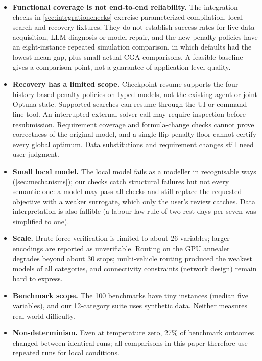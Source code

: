 \begin{itemize}
        condition. Hybrid service results are distinct from direct QPU sampling, and use a ten-second limit
        versus the three-second CGA ceiling; the resource allocations do not establish hardware superiority.
        Effects depend on the problem; Fujitsu DA rejected a submission due to its monthly
        account limit. The earlier simulation advantage is small, and neither role splitting nor retrieval
        helped there. Large-scale repeated hardware and held-out backend-transfer studies remain open.
  \item \textbf{Functional coverage is not end-to-end reliability.} The integration checks in
        \cref{sec:integrationchecks} exercise parameterized compilation, local search and recovery fixtures.
        They do not establish success rates for live data acquisition, LLM diagnosis or model repair, and the
        new penalty policies have an eight-instance repeated simulation comparison, in which defaults had the
        lowest mean gap, plus small actual-CGA comparisons. A feasible
        baseline gives a comparison point, not a guarantee of application-level quality.
  \item \textbf{Recovery has a limited scope.} Checkpoint resume supports the four history-based penalty
        policies on typed models, not the existing agent or joint Optuna state. Supported searches can resume
        through the UI or command-line tool. An interrupted external solver call may
        require inspection before resubmission. Requirement coverage and formula-change checks cannot prove
        correctness of the original model, and a single-flip penalty floor cannot certify every global
        optimum. Data substitutions and requirement changes still need user judgment.
  \item \textbf{Small local model.} The local model fails as a modeller in recognisable ways (\cref{sec:mechanisms});
        our checks catch structural failures but not every semantic one: a model may pass all checks and still
        replace the requested objective with a weaker surrogate, which only the user's review catches. Data
        interpretation is also fallible (a labour-law rule of two rest days per seven was simplified to one).
  \item \textbf{Scale.} Brute-force verification is limited to about 26 variables; larger encodings are reported
        as unverifiable. Routing on the GPU annealer degrades beyond about 30 stops; multi-vehicle routing
        produced the weakest models of all categories, and connectivity constraints (network design) remain hard
        to express.
  \item \textbf{Benchmark scope.} The 100 benchmarks have tiny instances (median five variables), and our
        12-category suite uses synthetic data. Neither measures real-world difficulty.
  \item \textbf{Non-determinism.} Even at temperature zero, 27\% of benchmark outcomes changed between identical
        runs; all comparisons in this paper therefore use repeated runs for local conditions.
\end{itemize}
